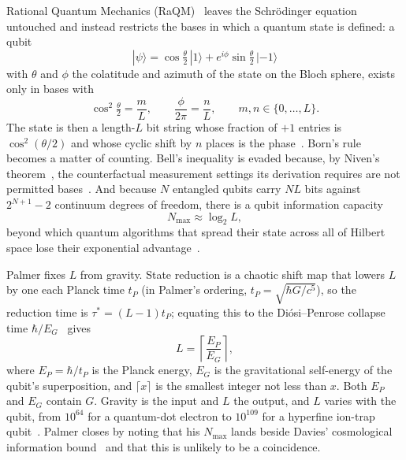 \documentclass[aps,prd,twocolumn,superscriptaddress,nofootinbib,showkeys]{revtex4-2}
\begin{document}
Rational Quantum Mechanics (RaQM)~\cite{palmer2020,palmer2026,palmer2026b,palmer2026c} leaves the Schr\"odinger equation untouched and instead restricts the bases in which a quantum state is defined: a qubit
\begin{equation}
|\psi\rangle = \cos\tfrac{\theta}{2}\,|1\rangle + e^{i\phi}\sin\tfrac{\theta}{2}\,|{-1}\rangle
\label{eq:qubit}
\end{equation}
with $\theta$ and $\phi$ the colatitude and azimuth of the state on the Bloch sphere, exists only in bases with
\begin{equation}
\cos^2\tfrac{\theta}{2} = \frac{m}{L},\qquad \frac{\phi}{2\pi} = \frac{n}{L},\qquad m,n\in\{0,\dots,L\}.
\label{eq:raqm}
\end{equation}
The state is then a length-$L$ bit string whose fraction of $+1$ entries is $\cos^2(\theta/2)$ and whose cyclic shift by $n$ places is the phase~\cite{palmer2026}. Born's rule becomes a matter of counting. Bell's inequality is evaded because, by Niven's theorem~\cite{niven1956,jahnel2010}, the counterfactual measurement settings its derivation requires are not permitted bases~\cite{palmer2024,palmer2026b}. And because $N$ entangled qubits carry $NL$ bits against $2^{N+1}-2$ continuum degrees of freedom, there is a qubit information capacity
\begin{equation}
N_{\max}\approx\log_2 L ,
\label{eq:nmax}
\end{equation}
beyond which quantum algorithms that spread their state across all of Hilbert space lose their exponential advantage~\cite{palmer2026}.

Palmer fixes $L$ from gravity. State reduction is a chaotic shift map that lowers $L$ by one each Planck time $t_P$ (in Palmer's ordering, $t_P = \sqrt{\hbar G/c^5}$), so the reduction time is $\tau^* = (L-1)t_P$; equating this to the Di\'osi--Penrose collapse time $\hbar/E_G$~\cite{diosi1989,penrose1996} gives
\begin{equation}
L = \left\lceil\frac{E_P}{E_G}\right\rceil ,
\label{eq:palmerL}
\end{equation}
where $E_P = \hbar/t_P$ is the Planck energy, $E_G$ is the gravitational self-energy of the qubit's superposition, and $\lceil x\rceil$ is the smallest integer not less than $x$. Both $E_P$ and $E_G$ contain $G$. Gravity is the input and $L$ the output, and $L$ varies with the qubit, from $10^{64}$ for a quantum-dot electron to $10^{109}$ for a hyperfine ion-trap qubit~\cite{palmer2026}. Palmer closes by noting that his $N_{\max}$ lands beside Davies' cosmological information bound~\cite{davies2007,lloyd2002} and that this is unlikely to be a coincidence.
\end{document}
